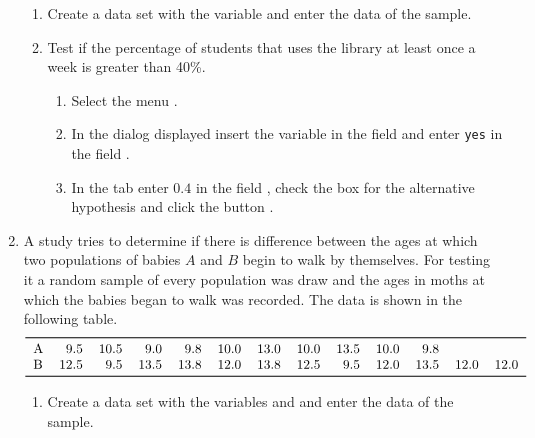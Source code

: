 \begin{enumerate}[leftmargin=*]
\begin{enumerate}
\item Create a data set with the variable  and enter the data of the sample.

\item Test if the percentage of students that uses the library at least once a week is greater than 40\%.
\begin{indication}
\begin{enumerate}
\item Select the menu .
\item In the dialog displayed insert the variable  in the field  and enter \texttt{yes}
in the field .
\item In the  tab enter $0.4$ in the field , check the box 
for the alternative hypothesis and click the button .
\end{enumerate}
\end{indication}
\end{enumerate}

\item A study tries to determine if there is difference between the ages at which two populations of babies $A$ and
$B$ begin to walk by themselves.
For testing it a random sample of every population was draw and the ages in moths at which the babies began
to walk was recorded.
The data is shown in the following table.
\[
\begin{tabular}{lrrrrrrrrrrrr}
\toprule
A & 9.5 & 10.5 & 9.0 & 9.8 & 10.0 & 13.0 & 10.0 & 13.5 & 10.0 & 9.8\\
B & 12.5 & 9.5 & 13.5 & 13.8 & 12.0 & 13.8 & 12.5 & 9.5 & 12.0 & 13.5 & 12.0 & 12.0\\
\bottomrule
\end{tabular}
\]

\begin{enumerate}
\item Create a data set with the variables  and  and enter the data of the sample.


\end{enumerate}
\end{enumerate}
